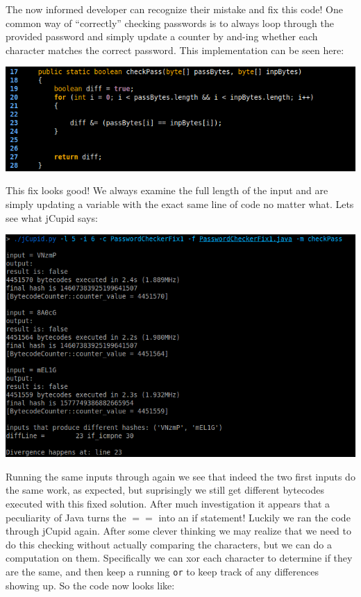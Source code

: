 The now informed developer can recognize their mistake and fix this code! One common way of ``correctly''
checking passwords is to always loop through the provided password and simply update a counter by and-ing
whether each character matches the correct password. This implementation can be seen here:

\begin{center}
  \includegraphics[width=\linewidth]{PasswordCheckerFix1}
\end{center}

This fix looks good! We always examine the full length of the input and are simply updating a variable
with the exact same line of code no matter what. Lets see what jCupid says:

\begin{center}
  \includegraphics[width=\linewidth]{jCupidRun2}
\end{center}

Running the same inputs through again we see that indeed the two first inputs do the same work, as expected,
but suprisingly we still get different bytecodes executed with this fixed solution. After much investigation
it appears that a peculiarity of Java turns the $==$ into an if statement! Luckily we ran the code through
jCupid again. After some clever thinking we may realize that we need to do this checking without actually
comparing the characters, but we can do a computation on them. Specifically we can xor each character to
determine if they are the same, and then keep a running \texttt{or} to keep track of any differences showing
up. So the code now looks like:

